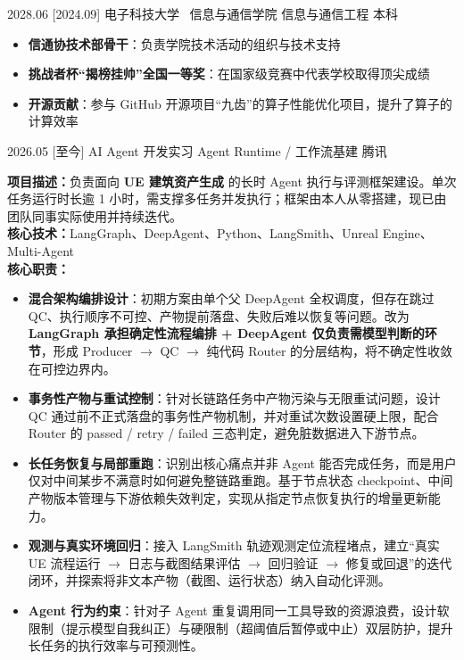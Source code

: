 \documentclass[zh]{resume}
\begin{document}
\makeheader

\begin{educations}
  \education%
    {2028.06}%
    [2024.09]%
    {电子科技大学~}%
    {信息与通信学院}%
    {信息与通信工程}%
    {本科}
\end{educations}
\begin{itemize}
  \item \textbf{信通协技术部骨干}：负责学院技术活动的组织与技术支持
  \item \textbf{挑战者杯“揭榜挂帅”全国一等奖}：在国家级竞赛中代表学校取得顶尖成绩
  \item \textbf{开源贡献}：参与 GitHub 开源项目“九齿”的算子性能优化项目，提升了算子的计算效率
\end{itemize}

\begin{projects}
  \project%
    {2026.05}%
    [至今]%
    {AI Agent 开发实习}%
    {Agent Runtime / 工作流基建}%
    {\large 腾讯~}%
    {\textbf{项目描述：}负责面向 \textbf{UE 建筑资产生成} 的长时 Agent 执行与评测框架建设。单次任务运行时长逾 1 小时，需支撑多任务并发执行；框架由本人从零搭建，现已由团队同事实际使用并持续迭代。 \\
    \textbf{核心技术：}LangGraph、DeepAgent、Python、LangSmith、Unreal Engine、Multi-Agent
    \vspace{0.5ex} \\ \textbf{核心职责：}
    \begin{itemize}
      \item \textbf{混合架构编排设计}：初期方案由单个父 DeepAgent 全权调度，但存在跳过 QC、执行顺序不可控、产物提前落盘、失败后难以恢复等问题。改为 \textbf{LangGraph 承担确定性流程编排 + DeepAgent 仅负责需模型判断的环节}，形成 Producer $\rightarrow$ QC $\rightarrow$ 纯代码 Router 的分层结构，将不确定性收敛在可控边界内。
      \item \textbf{事务性产物与重试控制}：针对长链路任务中产物污染与无限重试问题，设计 QC 通过前不正式落盘的事务性产物机制，并对重试次数设置硬上限，配合 Router 的 passed / retry / failed 三态判定，避免脏数据进入下游节点。
      \item \textbf{长任务恢复与局部重跑}：识别出核心痛点并非 Agent 能否完成任务，而是用户仅对中间某步不满意时如何避免整链路重跑。基于节点状态 checkpoint、中间产物版本管理与下游依赖失效判定，实现从指定节点恢复执行的增量更新能力。
      \item \textbf{观测与真实环境回归}：接入 LangSmith 轨迹观测定位流程堵点，建立“真实 UE 流程运行 $\rightarrow$ 日志与截图结果评估 $\rightarrow$ 回归验证 $\rightarrow$ 修复或回退”的迭代闭环，并探索将非文本产物（截图、运行状态）纳入自动化评测。
      \item \textbf{Agent 行为约束}：针对子 Agent 重复调用同一工具导致的资源浪费，设计软限制（提示模型自我纠正）与硬限制（超阈值后暂停或中止）双层防护，提升长任务的执行效率与可预测性。
    \end{itemize}}
\end{projects}
\end{document}
